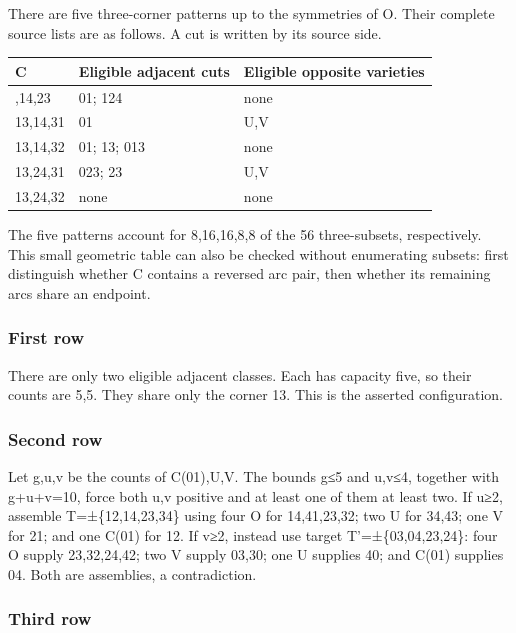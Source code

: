 \documentclass[
  10pt,
]{article}
\begin{document}
There are five three-corner patterns up to the symmetries of O. Their
complete source lists are as follows. A cut is written by its source
side.

\begin{longtable}[]{@{}lll@{}}
\toprule\noalign{}
C & Eligible adjacent cuts & Eligible opposite varieties \\
\midrule\noalign{}
\endhead
\bottomrule\noalign{}
\endlastfoot
13,14,23 & 01; 124 & none \\
13,14,31 & 01 & U,V \\
13,14,32 & 01; 13; 013 & none \\
13,24,31 & 023; 23 & U,V \\
13,24,32 & none & none \\
\end{longtable}

The five patterns account for 8,16,16,8,8 of the 56 three-subsets,
respectively. This small geometric table can also be checked without
enumerating subsets: first distinguish whether C contains a reversed arc
pair, then whether its remaining arcs share an endpoint.

\hypertarget{first-row}{%
\subsubsection*{First row}\label{first-row}}

There are only two eligible adjacent classes. Each has capacity five, so
their counts are 5,5. They share only the corner 13. This is the
asserted configuration.

\hypertarget{second-row}{%
\subsubsection*{Second row}\label{second-row}}

Let g,u,v be the counts of C(01),U,V. The bounds g≤5 and u,v≤4, together
with g+u+v=10, force both u,v positive and at least one of them at least
two. If u≥2, assemble T=±\{12,14,23,34\} using four O for 14,41,23,32;
two U for 34,43; one V for 21; and one C(01) for 12. If v≥2, instead use
target T'=±\{03,04,23,24\}: four O supply 23,32,24,42; two V supply
03,30; one U supplies 40; and C(01) supplies 04. Both are assemblies, a
contradiction.

\hypertarget{third-row}{%
\subsubsection*{Third row}\label{third-row}}
\end{document}
